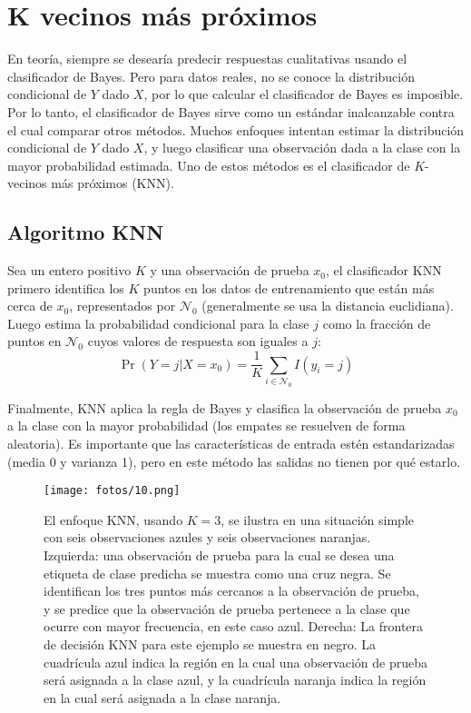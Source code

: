 \chapter{K vecinos más próximos}\label{Chapter5} 

En teoría, siempre se desearía predecir respuestas cualitativas usando el clasificador de Bayes. Pero para datos reales, no se conoce la distribución condicional de $Y$ dado $X$, por lo que calcular el clasificador de Bayes es imposible. Por lo tanto, el clasificador de Bayes sirve como un estándar inalcanzable contra el cual comparar otros métodos. Muchos enfoques intentan estimar la distribución condicional de $Y$ dado $X$, y luego clasificar una observación dada a la clase con la mayor probabilidad estimada. Uno de estos métodos es el clasificador de $K$-vecinos más próximos (KNN). 

\section{Algoritmo KNN}

Sea un entero positivo $K$ y una observación de prueba $x_0$, el clasificador KNN primero identifica los $K$ puntos en los datos de entrenamiento que están más cerca de $x_0$, representados por $\mathcal{N}_0$ (generalmente se usa la distancia euclidiana). Luego estima la probabilidad condicional para la clase $j$ como la fracción de puntos en $\mathcal{N}_0$ cuyos valores de respuesta son iguales a $j$:
\begin{equation}
\Pr(Y = j | X = x_0) = \frac{1}{K} \sum_{i \in \mathcal{N}_0} I(y_i = j)
\label{eq:2.12}
\end{equation}

Finalmente, KNN aplica la regla de Bayes y clasifica la observación de prueba $x_0$ a la clase con la mayor probabilidad (los empates se resuelven de forma aleatoria). Es importante que las características de entrada estén estandarizadas (media 0 y varianza 1), pero en este método las salidas no tienen por qué estarlo. \\

\begin{figure}[h]
\centering
\texttt{[image: fotos/10.png]}
\caption{El enfoque KNN, usando $K = 3$, se ilustra en una situación simple con seis observaciones azules y seis observaciones naranjas. Izquierda: una observación de prueba para la cual se desea una etiqueta de clase predicha se muestra como una cruz negra. Se identifican los tres puntos más cercanos a la observación de prueba, y se predice que la observación de prueba pertenece a la clase que ocurre con mayor frecuencia, en este caso azul. Derecha: La frontera de decisión KNN para este ejemplo se muestra en negro. La cuadrícula azul indica la región en la cual una observación de prueba será asignada a la clase azul, y la cuadrícula naranja indica la región en la cual será asignada a la clase naranja.}
\label{fig:2.14}
\end{figure}

